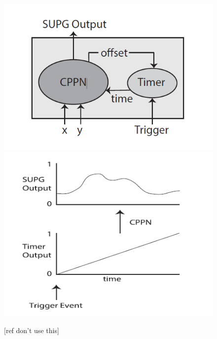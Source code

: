 \begin{figure}[!ht]
\centering
\includegraphics[scale=0.5]{SUPG}
\includegraphics[scale=0.5]{SUPGLinearTime}
\caption{[ref don't use this]}
\end{figure}

